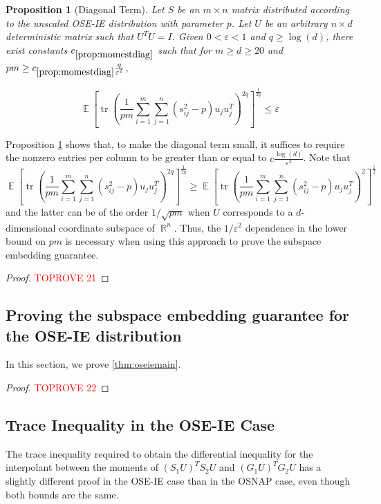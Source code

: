 \documentclass[11pt]{amsart}
\numberwithin{equation}{section}
\numberwithin{equation}{section}
\DeclareMathOperator{\E}{\mathbb{E}}
\DeclareMathOperator{\R}{\mathbb{R}}
\DeclareMathOperator*{\tr}{tr}
\newtheorem{proposition}[theorem]{Proposition}
\theoremstyle{remark}
\theoremstyle{definition}
\begin{document}
\begin{proposition}[Diagonal Term] \label{prop:momestdiag}
    Let $S$ be an $m \times n$ matrix distributed according to the unscaled OSE-IE distribution with parameter $p$. Let $U$ be an arbitrary $n \times d$ deterministic matrix such that $U^TU=I$. Given $0< \varepsilon < 1$ and $q \ge \log(d) $, there exist constants $c_{\ref*{prop:momestdiag}}$ such that for $m \geq d \ge 20$ and $pm \geq c_{\ref*{prop:momestdiag}} \frac{q }{\varepsilon^2} $,

\[ \E \left[ \tr \left( \frac{1}{pm }\sum_{i=1}^m \sum_{j =1}^n (s_{ij}^2 - p)u_ju_{j}^T \right)^{2q} \right]^\frac{1}{2q} \leq  \varepsilon \]

\end{proposition}
Proposition \ref{prop:momestdiag} shows that, to make the diagonal term small, it suffices to require the nonzero entries per column to be greater than or equal to $c\frac{\log(d)}{\varepsilon^2}$. Note that
    \[ \E \left[ \tr \left( \frac{1}{pm }\sum_{i=1}^m \sum_{j =1}^n (s_{ij}^2 - p)u_ju_{j}^T \right)^{2q} \right]^\frac{1}{2q} \ge  \E \left[ \tr \left( \frac{1}{pm }\sum_{i=1}^m \sum_{j =1}^n (s_{ij}^2 - p)u_ju_{j}^T \right)^{2} \right]^\frac{1}{2} \]
    and the latter can be of the order $1/\sqrt{pm}$ when $U$ corresponds to a $d$-dimensional coordinate subspace of $\R^n$. Thus, the $1/\varepsilon^2$ dependence in the lower bound on $pm$ is necessary when using this approach to prove the subspace embedding guarantee.

\begin{proof}\textcolor{red}{TOPROVE 21}\end{proof}




\subsection{Proving the subspace embedding guarantee for the OSE-IE distribution} \label{subsec:oseiemain}

In this section, we prove \ref{thm:oseiemain}.

\oseiemainthm*

\begin{proof}\textcolor{red}{TOPROVE 22}\end{proof}





\subsection{Trace Inequality in the OSE-IE Case}
The trace inequality required to obtain the differential inequality for the interpolant between the moments of $(S_1U)^TS_2U$ and $(G_1U)^TG_2U$ has a slightly different proof in the OSE-IE case than in the OSNAP case, even though both bounds are the same.
\end{document}
